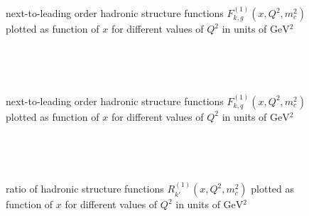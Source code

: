 \pagebreak
\begin{figure}[ht!]
\centering
\begin{subfigure}[t]{\textwidth}
	
\end{subfigure}\\%
\begin{subfigure}[t]{\textwidth}
	
\end{subfigure}\\%
\begin{subfigure}[t]{\textwidth}
	
\end{subfigure}
\caption{next-to-leading order hadronic structure functions $F_{k,g}^{(1)}(x,Q^2,m_c^2)$ plotted as function of $x$ for different values of $Q^2$ in units of $\si{\GeV^2}$}\label{fig:Fg1}
\end{figure}

\pagebreak
\begin{figure}[ht!]
\centering
\begin{subfigure}[t]{\textwidth}
	
\end{subfigure}\\%
\begin{subfigure}[t]{\textwidth}
	
\end{subfigure}\\%
\begin{subfigure}[t]{\textwidth}
	
\end{subfigure}
\caption{next-to-leading order hadronic structure functions $F_{k,q}^{(1)}(x,Q^2,m_c^2)$ plotted as function of $x$ for different values of $Q^2$ in units of $\si{\GeV^2}$}\label{fig:Fq1}
\end{figure}

\pagebreak
\begin{figure}[ht!]
\centering
\begin{subfigure}[t]{\textwidth}
	
\end{subfigure}\\%
\begin{subfigure}[t]{\textwidth}
	
\end{subfigure}\\%
\begin{subfigure}[t]{\textwidth}
	
\end{subfigure}
\caption{ratio of hadronic structure functions $R_{k'}^{(1)}(x,Q^2,m_c^2)$ plotted as function of $x$ for different values of $Q^2$ in units of $\si{\GeV^2}$}\label{fig:R}
\end{figure}

\clearpage
\pagebreak
